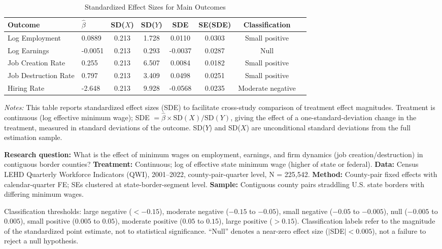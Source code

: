 \begin{table}[H]
\centering
\caption{Standardized Effect Sizes for Main Outcomes}
\label{tab:sde}
\begin{adjustbox}{max width=\textwidth}
\begin{tabular}{llcccccc}
\toprule
Outcome & $\hat{\beta}$ & SD($X$) & SD($Y$) & SDE & SE(SDE) & Classification \\
\midrule
Log Employment & 0.0889 & 0.213 & 1.728 & 0.0110 & 0.0303 & Small positive \\
Log Earnings & -0.0051 & 0.213 & 0.293 & -0.0037 & 0.0287 & Null \\
Job Creation Rate & 0.255 & 0.213 & 6.507 & 0.0084 & 0.0182 & Small positive \\
Job Destruction Rate & 0.797 & 0.213 & 3.409 & 0.0498 & 0.0251 & Small positive \\
Hiring Rate & -2.648 & 0.213 & 9.928 & -0.0568 & 0.0235 & Moderate negative \\
\bottomrule
\end{tabular}
\end{adjustbox}
\par\vspace{0.3em}
{\footnotesize \emph{Notes:} This table reports standardized effect sizes (SDE) to facilitate cross-study comparison of treatment effect magnitudes. Treatment is continuous (log effective minimum wage); SDE $= \hat{\beta} \times \text{SD}(X) / \text{SD}(Y)$, giving the effect of a one-standard-deviation change in the treatment, measured in standard deviations of the outcome. SD($Y$) and SD($X$) are unconditional standard deviations from the full estimation sample.

\textbf{Research question:} What is the effect of minimum wages on employment, earnings, and firm dynamics (job creation/destruction) in contiguous border counties?
\textbf{Treatment:} Continuous; log of effective state minimum wage (higher of state or federal).
\textbf{Data:} Census LEHD Quarterly Workforce Indicators (QWI), 2001--2022, county-pair-quarter level, N = 225,542.
\textbf{Method:} County-pair fixed effects with calendar-quarter FE; SEs clustered at state-border-segment level.
\textbf{Sample:} Contiguous county pairs straddling U.S. state borders with differing minimum wages.

Classification thresholds: large negative ($< -0.15$), moderate negative ($-0.15$ to $-0.05$), small negative ($-0.05$ to $-0.005$), null ($-0.005$ to $0.005$), small positive ($0.005$ to $0.05$), moderate positive ($0.05$ to $0.15$), large positive ($> 0.15$).
Classification labels refer to the magnitude of the standardized point estimate, not to statistical significance. ``Null'' denotes a near-zero effect size ($|$SDE$| < 0.005$), not a failure to reject a null hypothesis.}
\end{table}
